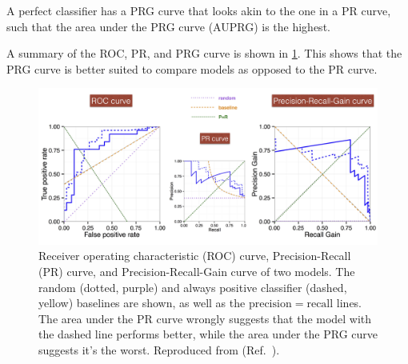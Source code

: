 A perfect classifier has a PRG curve that looks akin to the one in a PR curve, such that the area under the PRG curve (AUPRG) is the highest.

A summary of the ROC, PR, and PRG curve is shown in \cref{fig:roc-pr-prg-curve}.
This shows that the PRG curve is better suited to compare models as opposed to the PR curve.

\begin{figure}
    \centering
    \includegraphics[width=\linewidth]{pediatric-brain-tumours/images/roc-pr-prg-curves.jpg}
    \caption{
        Receiver operating characteristic (ROC) curve, Precision-Recall (PR) curve, and Precision-Recall-Gain curve of two models.
        The random (dotted, purple) and always positive classifier (dashed, yellow) baselines are shown, as well as the $\mathrm{precision} = \mathrm{recall}$ lines.
        The area under the PR curve wrongly suggests that the model with the dashed line performs better, while the area under the PRG curve suggests it's the worst.
        Reproduced from  (Ref.~\cite{Flach2015}).
    }
    \label{fig:roc-pr-prg-curve}
\end{figure}




